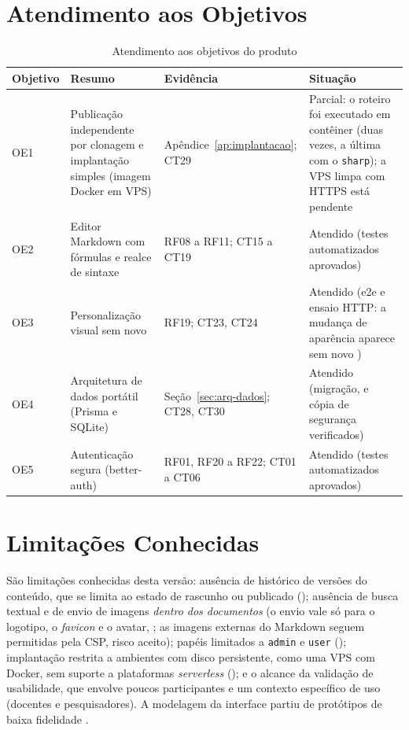 \section{Atendimento aos Objetivos}\label{sec:res-objetivos}

\begin{table}[htb]
\caption{Atendimento aos objetivos do produto}\label{tab:res-objetivos}
\small
\begin{tabularx}{\linewidth}{@{}L{1.3cm}YL{3.6cm}L{2.0cm}@{}}
\toprule
\textbf{Objetivo} & \textbf{Resumo} & \textbf{Evidência} & \textbf{Situação}\\
\midrule
OE1 & Publicação independente por clonagem e implantação simples (imagem Docker em VPS) & Apêndice~\ref{ap:implantacao}; CT29 & Parcial: o roteiro foi executado em contêiner (duas vezes, a última com o \texttt{sharp}); a VPS limpa com HTTPS está pendente\\
OE2 & Editor Markdown com fórmulas e realce de sintaxe & RF08 a RF11; CT15 a CT19 & Atendido (testes automatizados aprovados)\\
OE3 & Personalização visual sem novo  & RF19; CT23, CT24 & Atendido (e2e e ensaio HTTP: a mudança de aparência aparece sem novo )\\
OE4 & Arquitetura de dados portátil (Prisma e SQLite) & Seção~\ref{sec:arq-dados}; CT28, CT30 & Atendido (migração,  e cópia de segurança verificados)\\
OE5 & Autenticação segura (better-auth) & RF01, RF20 a RF22; CT01 a CT06 & Atendido (testes automatizados aprovados)\\
\bottomrule
\end{tabularx}
\end{table}

\section{Limitações Conhecidas}\label{sec:res-limitacoes}

São limitações conhecidas desta versão: ausência de histórico de versões do conteúdo, que se limita ao estado de rascunho ou publicado (); ausência de busca textual e de envio de imagens \emph{dentro dos documentos} (o envio vale só para o logotipo, o \emph{favicon} e o avatar, ; as imagens externas do Markdown seguem permitidas pela CSP, risco aceito); papéis limitados a \texttt{admin} e \texttt{user} (); implantação restrita a ambientes com disco persistente, como uma VPS com Docker, sem suporte a plataformas \emph{serverless} (); e o alcance da validação de usabilidade, que envolve poucos participantes e um contexto específico de uso (docentes e pesquisadores). A modelagem da interface partiu de protótipos de baixa fidelidade \cite{reis2026ic}.

